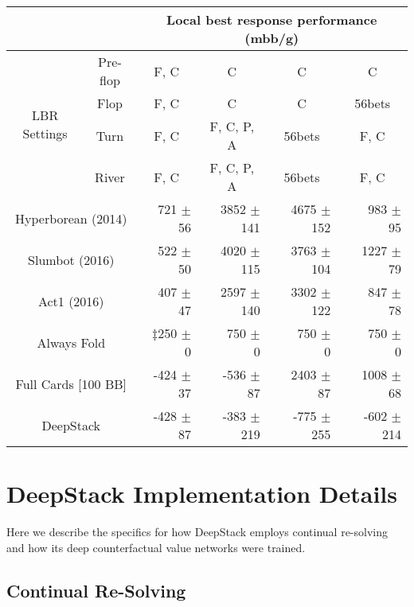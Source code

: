 \begin{table}
\begin{tabular}{cc|rrrr}
\toprule
\multicolumn{2}{c}{~} & \multicolumn{4}{c}{Local best response performance (mbb/g)}\\
\midrule
\multirow{4}{*}{LBR Settings} & Pre-flop & \multicolumn{1}{c}{F, C} & \multicolumn{1}{c}{C} & \multicolumn{1}{c}{C} & \multicolumn{1}{c}{C}\\
 & Flop & \multicolumn{1}{c}{F, C} & \multicolumn{1}{c}{C} & \multicolumn{1}{c}{C} & \multicolumn{1}{c}{56bets}\\ 
 & Turn & \multicolumn{1}{c}{F, C} & \multicolumn{1}{c}{F, C, P, A} & \multicolumn{1}{c}{56bets} & \multicolumn{1}{c}{F, C}\\
 & River& \multicolumn{1}{c}{F, C} & \multicolumn{1}{c}{F, C, P, A} & \multicolumn{1}{c}{56bets} & \multicolumn{1}{c}{F, C}\\
\midrule
\multicolumn{2}{c|}{Hyperborean (2014)} & 721 $\pm$ 56 & 3852 $\pm$ 141 & 4675 $\pm$ 152 & 983 $\pm$ ~~95 \\
\multicolumn{2}{c|}{Slumbot  (2016)} & 522 $\pm$ 50 & 4020 $\pm$ 115 & 3763 $\pm$ 104 & 1227 $\pm$ ~~79  \\
\multicolumn{2}{c|}{Act1 (2016)} & 407 $\pm$ 47 & 2597 $\pm$ 140 & 3302 $\pm$ 122 &  847 $\pm$ ~~78\\ 
\multicolumn{2}{c|}{Always Fold} & $\ddagger$250 $\pm$ ~~0 & 750 $\pm$ ~~~~0 & 750 $\pm$ ~~~~0 & 750 $\pm$ ~~~~0 \\
\multicolumn{2}{c|}{Full Cards [100 BB]} &  -424 $\pm$ 37 & -536 $\pm$ ~~87 & 2403 $\pm$ ~~87  & 1008 $\pm$ ~~68 \\
\multicolumn{2}{c|}{\cellcolor[HTML]{C0C0C0} DeepStack} & \cellcolor[HTML]{C0C0C0}-428 $\pm$ 87 & \cellcolor[HTML]{C0C0C0}-383 $\pm$ 219 &  \cellcolor[HTML]{C0C0C0}-775 $\pm$ 255  &  \cellcolor[HTML]{C0C0C0}-602 $\pm$ 214\\
\bottomrule
\end{tabular}
\end{table}

\section*{DeepStack Implementation Details}

Here we describe the specifics for how DeepStack employs continual re-solving and how its deep counterfactual value networks were trained.

\subsection*{Continual Re-Solving}

